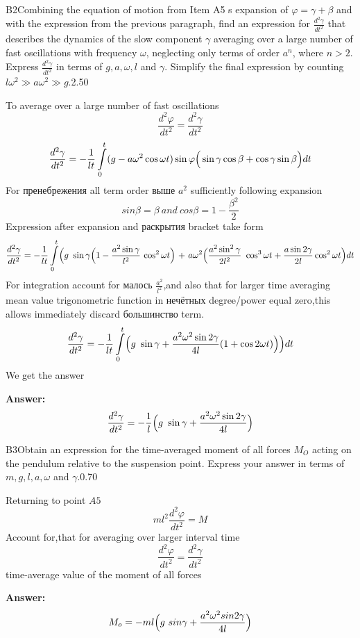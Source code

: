 \documentclass[11pt,a4paper]{article}
\begin{document}
\begin{solcard}{B2}{Combining the equation of motion from Item A5 s expansion of $\varphi=\gamma+\beta$ and with the expression from the previous paragraph, find an expression for $\frac{d^2\gamma}{dt^2}$ that describes the dynamics of the slow component $\gamma$ averaging over a large number of fast oscillations with frequency $\omega$, neglecting only terms of order $a^n$, where $n>2$. Express $\frac{d^2\gamma}{dt^2}$ in terms of $g, a, \omega, l$ and $\gamma$. Simplify the final expression by counting $l\omega^2\gg a\omega^2\gg g$.}{2.50}

To average over a large number of fast oscillations $$\frac{d^2{\varphi}}{dt^2}=\frac{d^2{\gamma}}{dt^2} $$$$\frac{d^2{\gamma}}{dt^2}=-\frac{1}{lt}\int\limits_0^{t} (g-a\omega^2\cos \omega t)\sin \varphi\Bigr(\sin{\gamma}\cos{\beta}+\cos{\gamma}\sin{\beta}\Bigl)dt $$For пренебрежения all term order выше $a^2$ sufficiently following expansion $$sin{\beta}=\beta~and~cos{\beta}=1-\frac{{\beta}^2}{2} $$Expression after expansion and раскрытия bracket take form $$\frac{d^2{\gamma}}{dt^2}=-\frac{1}{lt}\int\limits_0^{t} \Bigr(g~\sin{\gamma}\Bigr(1-\frac{a^2\sin{\gamma}}{l^2}~{\cos^2{\omega}t}\Bigl)~+~a{\omega}^2\Bigr(  \frac{a^2\sin^2{\gamma}}{2l^2}~\cos^3{\omega}t +\frac{a\sin{2\gamma}}{2l}\cos^2{\omega}t\Bigl)dt $$For integration account for малось $\frac{a^2}{l^2}$,and also that for larger time averaging mean value trigonometric function in нечётных degree/power equal zero,this allows immediately discard большинство term. $$\frac{d^2{\gamma}}{dt^2}=-\frac{1}{lt}\int\limits_0^{t} \Bigr(g~\sin{\gamma}+\frac{a^2{\omega}^2\sin{2\gamma}}{4l}(1+\cos{2\omega}t)\Bigl)\Bigl)dt $$We get the answer

\par\smallskip\noindent\textbf{Answer:} $$\frac{d^2{\gamma}}{dt^2}=-\frac{1}{l}\Bigr(g~\sin{\gamma}+\frac{a^2{\omega}^2\sin{2\gamma}}{4l}\Bigl) $$
\end{solcard}

\begin{solcard}{B3}{Obtain an expression for the time-averaged moment of all forces $M_O$ acting on the pendulum relative to the suspension point. Express your answer in terms of $m, g, l, a, \omega$ and $\gamma$.}{0.70}

Returning to point $A5$ $$ml^2\frac{d^2{\varphi}}{dt^2}=M $$Account for,that for averaging over larger interval time $$\frac{d^2{\varphi}}{dt^2}=\frac{d^2{\gamma}}{dt^2} $$time-average value of the moment of all forces

\par\smallskip\noindent\textbf{Answer:} $$M_o=-ml\Bigr(g~sin{\gamma}+\frac{a^2{\omega}^2sin{2\gamma}}{4l}\Bigl) $$
\end{solcard}
\end{document}
